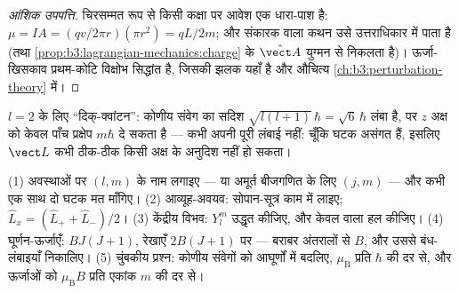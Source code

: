 \begin{proof}[आंशिक उपपत्ति]
चिरसम्मत रूप से किसी कक्षा पर आवेश एक धारा-पाश है: $\mu = IA =
(qv/2\pi r)(\pi r^2) = qL/2m$; और संकारक वाला कथन उसे उत्तराधिकार में
पाता है (तथा \cref{prop:b3:lagrangian-mechanics:charge} के
$\hat{\vect A}$ युग्मन से निकलता है)। ऊर्जा-खिसकाव प्रथम-कोटि
विक्षोभ सिद्धांत है, जिसकी झलक यहाँ है और औचित्य
\cref{ch:b3:perturbation-theory} में।
\end{proof}

\begin{omfigure}

{\small $l = 2$ के लिए ``दिक्-क्वांटन'': कोणीय संवेग का
सदिश $\sqrt{l(l+1)}\,\hbar = \sqrt6\,\hbar$ लंबा है, पर $z$ अक्ष को
केवल पाँच प्रक्षेप $m\hbar$ दे सकता है --- कभी अपनी
पूरी लंबाई नहीं: चूँकि घटक असंगत हैं, इसलिए $\vect L$ कभी
ठीक-ठीक किसी अक्ष के अनुदिश नहीं हो सकता।}
\end{omfigure}

\begin{method}[कोणीय संवेग, व्यवहार में]\label{met:b3:quantum-angular-momentum:method}
(1) अवस्थाओं पर $(l, m)$ के नाम लगाइए --- या अमूर्त बीजगणित के लिए
$(j, m)$ --- और कभी एक साथ दो घटक मत माँगिए। (2) आव्यूह-अवयव:
सोपान-सूत्र काम में लाइए; $\hat L_x = (\hat L_+ + \hat
L_-)/2$। (3) केंद्रीय विभव: $Y_l^m$ उद्धृत कीजिए, और केवल
 वाला  हल कीजिए। (4) घूर्णन-ऊर्जाएँ:
$BJ(J+1)$, रेखाएँ $2B(J+1)$ पर --- बराबर अंतरालों से $B$, और उससे
बंध-लंबाइयाँ निकालिए। (5) चुंबकीय प्रश्न: कोणीय संवेगों को आघूर्णों में
बदलिए, $\mu_{\text{B}}$ प्रति $\hbar$ की दर से, और ऊर्जाओं को
$\mu_{\text{B}}B$ प्रति एकांक $m$ की दर से।
\end{method}

